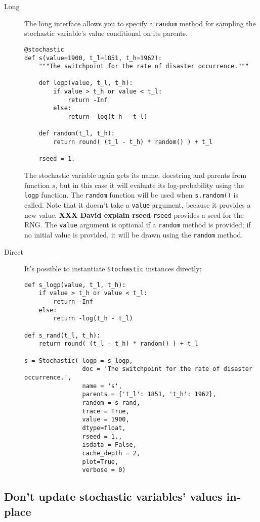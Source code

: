 \begin{description}
    \item[Long] The long interface allows you to specify a \texttt{random} method for sampling the stochastic variable's value conditional on its parents.
    \begin{verbatim}
@stochastic
def s(value=1900, t_l=1851, t_h=1962):
    """The switchpoint for the rate of disaster occurrence."""

    def logp(value, t_l, t_h):
        if value > t_h or value < t_l:
            return -Inf
        else:
            return -log(t_h - t_l) 
            
    def random(t_l, t_h):
        return round( (t_l - t_h) * random() ) + t_l

    rseed = 1.
    \end{verbatim}
The stochastic variable again gets its name, docstring and parents from function $s$, but in this case it will evaluate its log-probability using the \texttt{logp} function. The \texttt{random} function will be used when \texttt{s.random()} is called. Note that it doesn't take a \texttt{value} argument, because it provides a new value. \textbf{XXX David explain rseed} \texttt{rseed} provides a seed for the RNG. The \texttt{value} argument is optional if a \texttt{random} method is provided; if no initial value is provided, it will be drawn using the \texttt{random} method.

    \item[Direct] It's possible to instantiate \texttt{Stochastic} instances directly:
\begin{verbatim}
def s_logp(value, t_l, t_h):
    if value > t_h or value < t_l:
        return -Inf
    else:
        return -log(t_h - t_l) 

def s_rand(t_l, t_h):
    return round( (t_l - t_h) * random() ) + t_l

s = Stochastic( logp = s_logp, 
                doc = 'The switchpoint for the rate of disaster occurrence.',
                name = 's', 
                parents = {'t_l': 1851, 't_h': 1962},
                random = s_rand,                 
                trace = True,                 
                value = 1900,
                dtype=float,
                rseed = 1., 
                isdata = False,
                cache_depth = 2,
                plot=True,
                verbose = 0)
\end{verbatim}
\end{description}

\subsection{Don't update stochastic variables' values in-place}\label{sub:warning}

